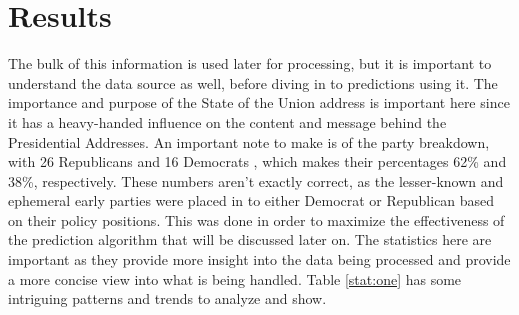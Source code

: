 \section{Results}
The bulk of this information is used later for processing, but it is important to understand the data source as well, before diving in to predictions using it.
The importance and purpose of the State of the Union address is important here since it has a heavy-handed influence on the content and message behind the Presidential Addresses.
An important note to make is of the party breakdown, with 26 Republicans and 16 Democrats , which makes their percentages 62\% and 38\%, respectively.
These numbers aren't exactly correct, as the lesser-known and ephemeral early parties were placed in to either Democrat or Republican based on their policy positions.
This was done in order to maximize the effectiveness of the prediction algorithm that will be discussed later on.
The statistics here are important as they provide more insight into the data being processed and provide a more concise view into what is being handled.
Table \ref{stat:one} has some intriguing patterns and trends to analyze and show.

